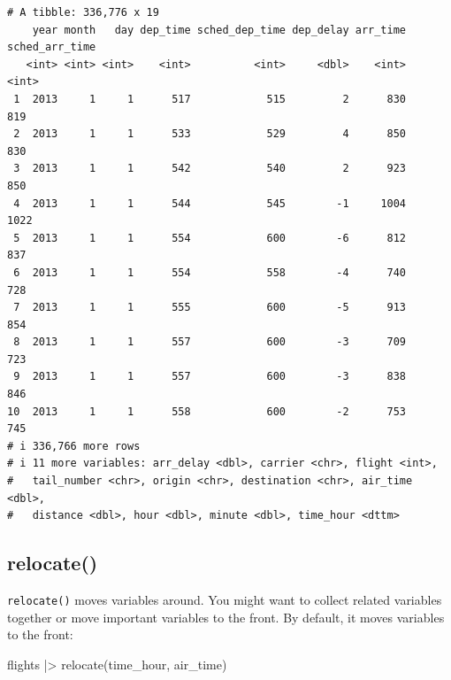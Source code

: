 \documentclass[
  letterpaper,
  DIV=11,
  numbers=noendperiod]{scrreprt}
\newenvironment{Shaded}{\begin{snugshade}}{\end{snugshade}}
\newcommand{\FunctionTok}[1]{\textcolor[rgb]{0.28,0.35,0.67}{#1}}
\newcommand{\NormalTok}[1]{\textcolor[rgb]{0.00,0.23,0.31}{#1}}
\newcommand{\SpecialCharTok}[1]{\textcolor[rgb]{0.37,0.37,0.37}{#1}}
\begin{document}
\begin{verbatim}
# A tibble: 336,776 x 19
    year month   day dep_time sched_dep_time dep_delay arr_time sched_arr_time
   <int> <int> <int>    <int>          <int>     <dbl>    <int>          <int>
 1  2013     1     1      517            515         2      830            819
 2  2013     1     1      533            529         4      850            830
 3  2013     1     1      542            540         2      923            850
 4  2013     1     1      544            545        -1     1004           1022
 5  2013     1     1      554            600        -6      812            837
 6  2013     1     1      554            558        -4      740            728
 7  2013     1     1      555            600        -5      913            854
 8  2013     1     1      557            600        -3      709            723
 9  2013     1     1      557            600        -3      838            846
10  2013     1     1      558            600        -2      753            745
# i 336,766 more rows
# i 11 more variables: arr_delay <dbl>, carrier <chr>, flight <int>,
#   tail_number <chr>, origin <chr>, destination <chr>, air_time <dbl>,
#   distance <dbl>, hour <dbl>, minute <dbl>, time_hour <dttm>
\end{verbatim}

\subsection{relocate()}\label{relocate}

\texttt{relocate()} moves variables around. You might want to collect
related variables together or move important variables to the front. By
default, it moves variables to the front:

\begin{Shaded}
\begin{Highlighting}[]
\NormalTok{flights }\SpecialCharTok{|\textgreater{}}
  \FunctionTok{relocate}\NormalTok{(time\_hour, air\_time)}
\end{Highlighting}
\end{Shaded}
\end{document}
